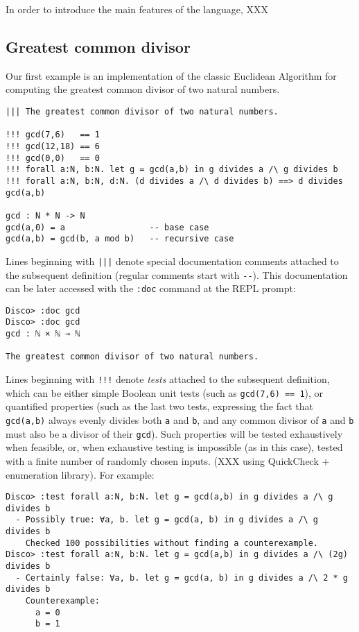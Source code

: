 \documentclass[submission,copyright,creativecommons]{eptcs}
\begin{document}
In order to introduce the main features of the language, XXX

\subsection{Greatest common divisor}
\label{sec:gcd}

Our first example is an implementation of the classic Euclidean
Algorithm for computing the greatest common divisor of two natural numbers.

\begin{verbatim}
||| The greatest common divisor of two natural numbers.

!!! gcd(7,6)   == 1
!!! gcd(12,18) == 6
!!! gcd(0,0)   == 0
!!! forall a:N, b:N. let g = gcd(a,b) in g divides a /\ g divides b
!!! forall a:N, b:N, d:N. (d divides a /\ d divides b) ==> d divides gcd(a,b)

gcd : N * N -> N
gcd(a,0) = a                 -- base case
gcd(a,b) = gcd(b, a mod b)   -- recursive case
\end{verbatim}

Lines beginning with \texttt{|||} denote special documentation
comments attached to the subsequent definition (regular comments start with
\texttt{-{}-}).  This documentation can be later accessed with the
\texttt{:doc} command at the REPL prompt:

\begin{verbatim}
Disco> :doc gcd
Disco> :doc gcd
gcd : ℕ × ℕ → ℕ

The greatest common divisor of two natural numbers.
\end{verbatim}

Lines beginning with \texttt{!!!} denote \emph{tests} attached to the
subsequent definition, which can be either simple Boolean unit tests
(such as \verb|gcd(7,6) == 1|), or quantified properties (such as the
last two tests, expressing the fact that \verb|gcd(a,b)| always evenly
divides both \verb|a| and \verb|b|, and any common divisor of \verb|a|
and \verb|b| must also be a divisor of their \verb|gcd|).  Such
properties will be tested exhaustively when feasible, or, when
exhaustive testing is impossible (as in this case), tested with a
finite number of randomly chosen inputs. (XXX using QuickCheck +
enumeration library).  For example:

\begin{verbatim}
Disco> :test forall a:N, b:N. let g = gcd(a,b) in g divides a /\ g divides b
  - Possibly true: ∀a, b. let g = gcd(a, b) in g divides a /\ g divides b
    Checked 100 possibilities without finding a counterexample.
Disco> :test forall a:N, b:N. let g = gcd(a,b) in g divides a /\ (2g) divides b
  - Certainly false: ∀a, b. let g = gcd(a, b) in g divides a /\ 2 * g divides b
    Counterexample:
      a = 0
      b = 1
\end{verbatim}
\end{document}
